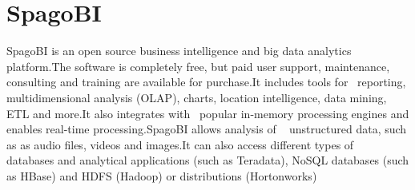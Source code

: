 \section{SpagoBI}
SpagoBI is an open source business intelligence and big data analytics platform.The software is completely free, but paid user support, maintenance, consulting and training are available for purchase.It includes tools for~\cite{spagobi} reporting, multidimensional analysis (OLAP), charts, location intelligence, data mining, ETL and more.It also integrates with~\cite{spagobi} popular in-memory processing engines and enables real-time processing.SpagoBI allows analysis of ~\cite{stratebi-bigdata} unstructured data, such as as audio files, videos and images.It can also access different types of
~\cite{stratebi-bigdata} databases and analytical applications (such as Teradata), NoSQL databases (such as HBase) and HDFS (Hadoop) or distributions (Hortonworks)
